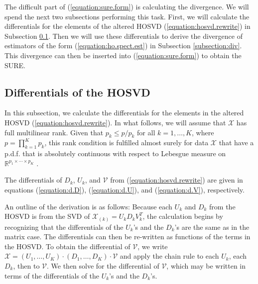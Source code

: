 The difficult part of (\ref{equation:sure.form}) is calculating the
divergence. We will spend the next two subsections performing this
task. First, we will calculate the differentials for the elements of
the altered HOSVD (\ref{equation:hosvd.rewrite}) in Subsection
\ref{subsection:diff}. Then we will use these differentials to derive
the divergence of estimators of the form (\ref{equation:ho.spect.est})
in Subsection \ref{subsection:div}. This divergence can then be
inserted into (\ref{equation:sure.form}) to obtain the SURE.





\subsection{Differentials of the HOSVD}
\label{subsection:diff}
In this subsection, we calculate the differentials for the elements in
the altered HOSVD (\ref{equation:hosvd.rewrite}). In what follows, we
will assume that $\mathcal{X}$ has full multilinear rank. Given that
$p_k \leq p/p_k$ for all $k = 1,\ldots,K$, where $p =
\prod_{k=1}^Kp_k$, this rank condition is fulfilled almost surely for
data $\mathcal{X}$ that have a p.d.f. that is absolutely continuous
with respect to Lebesgue measure on $\mathbb{R}^{p_1\times\cdots\times
  p_K}$ \cite[Proposition 7.2]{de2008tensor}.

\begin{theorem}
  \label{theorem:diff}
  The differentials of $D_k$, $U_k$, and $\mathcal{V}$ from
  (\ref{equation:hosvd.rewrite}) are given in equations
  (\ref{equation:d.D}), (\ref{equation:d.U}), and
  (\ref{equation:d.V}), respectively.
\end{theorem}


An outline of the derivation is as follows: Because each $U_k$ and
$D_k$ from the HOSVD is from the SVD of $\mathcal{X}_{(k)} =
U_kD_kV_k^T$, the calculation begins by recognizing that the
differentials of the $U_k$'s and the $D_k$'s are the same as in the
matrix case. The differentials can then be re-written as functions of
the terms in the HOSVD. To obtain the differential of $\mathcal{V}$,
we write $\mathcal{X} =
(U_1,\ldots,U_K)\cdot(D_1,\ldots,D_K)\cdot\mathcal{V}$ and apply the
chain rule to each $U_k$, each $D_k$, then to $\mathcal{V}$. We then
solve for the differential of $\mathcal{V}$, which may be written in
terms of the differentials of the $U_k$'s and the $D_k$'s.

